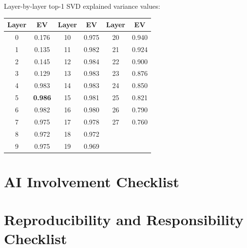 \documentclass{article}
\begin{document}
Layer-by-layer top-1 SVD explained variance values:

\begin{center}
\small
\begin{tabular}{cc|cc|cc}
\toprule
Layer & EV & Layer & EV & Layer & EV \\
\midrule
0  & 0.176 & 10 & 0.975 & 20 & 0.940 \\
1  & 0.135 & 11 & 0.982 & 21 & 0.924 \\
2  & 0.145 & 12 & 0.984 & 22 & 0.900 \\
3  & 0.129 & 13 & 0.983 & 23 & 0.876 \\
4  & 0.983 & 14 & 0.983 & 24 & 0.850 \\
5  & \textbf{0.986} & 15 & 0.981 & 25 & 0.821 \\
6  & 0.982 & 16 & 0.980 & 26 & 0.790 \\
7  & 0.975 & 17 & 0.978 & 27 & 0.760 \\
8  & 0.972 & 18 & 0.972 & & \\
9  & 0.975 & 19 & 0.969 & & \\
\bottomrule
\end{tabular}
\end{center}

\section{AI Involvement Checklist}
\label{app:ai}


\section{Reproducibility and Responsibility Checklist}
\label{app:repro}

\end{document}
